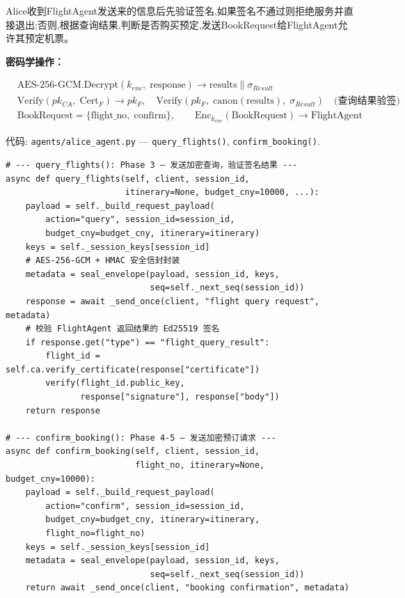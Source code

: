 \item [step4] Alice收到FlightAgent发送来的信息后先验证签名,如果签名不通过则拒绝服务并直接退出;否则,根据查询结果,判断是否购买预定,发送BookRequest给FlightAgent允许其预定机票。

    \textbf{密码学操作：}
    \begin{coreconcept}
    \begin{align*}
        &\text{AES-256-GCM}.\text{Decrypt}(k_{enc},\; \text{response}) \to \text{results} \parallel \sigma_{Result} \\
        &\text{Verify}(pk_{CA},\; \text{Cert}_F) \to pk_F,\quad \text{Verify}(pk_F,\; \text{canon}(\text{results}),\; \sigma_{Result}) \quad \text{(查询结果验签)}\\
        &\text{BookRequest} = \{\text{flight\_no},\; \text{confirm}\},\qquad \text{Enc}_{k_{enc}}(\text{BookRequest}) \to \text{FlightAgent}
    \end{align*}
    \end{coreconcept}
    代码: \texttt{agents/alice\_agent.py} — \texttt{query\_flights()}, \texttt{confirm\_booking()}.

\begin{lstlisting}[caption={agents/alice\_agent.py — query\_flights() \& confirm\_booking()}]
# --- query_flights(): Phase 3 — 发送加密查询，验证签名结果 ---
async def query_flights(self, client, session_id,
                        itinerary=None, budget_cny=10000, ...):
    payload = self._build_request_payload(
        action="query", session_id=session_id,
        budget_cny=budget_cny, itinerary=itinerary)
    keys = self._session_keys[session_id]
    # AES-256-GCM + HMAC 安全信封封装
    metadata = seal_envelope(payload, session_id, keys,
                             seq=self._next_seq(session_id))
    response = await _send_once(client, "flight query request", metadata)
    # 校验 FlightAgent 返回结果的 Ed25519 签名
    if response.get("type") == "flight_query_result":
        flight_id = self.ca.verify_certificate(response["certificate"])
        verify(flight_id.public_key,
               response["signature"], response["body"])
    return response

# --- confirm_booking(): Phase 4-5 — 发送加密预订请求 ---
async def confirm_booking(self, client, session_id,
                          flight_no, itinerary=None, budget_cny=10000):
    payload = self._build_request_payload(
        action="confirm", session_id=session_id,
        budget_cny=budget_cny, itinerary=itinerary,
        flight_no=flight_no)
    keys = self._session_keys[session_id]
    metadata = seal_envelope(payload, session_id, keys,
                             seq=self._next_seq(session_id))
    return await _send_once(client, "booking confirmation", metadata)
\end{lstlisting}